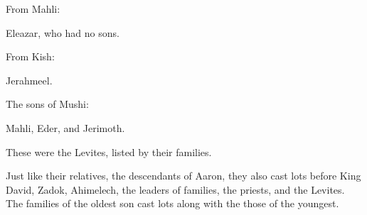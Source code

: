 {\par }{\PP {}From Mahli:
\par }{\PP Eleazar,
who had no
sons.
\par }{\PP {}From Kish:
\par }{\PP Jerahmeel.
\par }{\PP {}The sons
of Mushi:
\par }{\PP Mahli,
Eder,
and Jerimoth.
\par }{\PP These
were the Levites,
listed
by their families.
\par }{\PP {}Just like their relatives,
the descendants
of Aaron,
they
also
cast
lots
before
King
David,
Zadok,
Ahimelech,
the leaders
of families,
the priests,
and the Levites.
The families
of the oldest
son cast lots along with
the those of the youngest.

}
